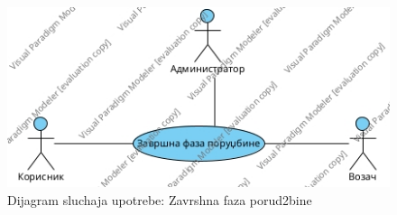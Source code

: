 \begin{figure}[h!]
	\includegraphics[scale=0.5]{Slike/UML/SUzavrsnaFazaPorudzbineUse Case Diagram.jpg}
	\centering
	\caption{Dijagram sluchaja upotrebe: Zavrshna faza porud2bine}
	\label{ucZavrsnaFaza}
\end{figure}

\newpage

